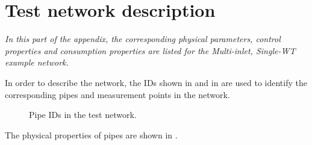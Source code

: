 \chapter{Test network description}
\label{physical_properties_example1}

\emph{In this part of the appendix, the corresponding physical parameters, control properties and consumption properties are listed for the Multi-inlet, Single-WT example network.}

In order to describe the network, the IDs shown in  and in  are used to identify the corresponding pipes and measurement points in the network. 

\begin{figure}[H]
\centering
 
\caption{Pipe IDs in the test network.}
\label{fig:epanet_example1_id_pipes}
\end{figure}
\vspace{-3mm}

The physical properties of pipes are shown in .

\vspace{-3mm}

